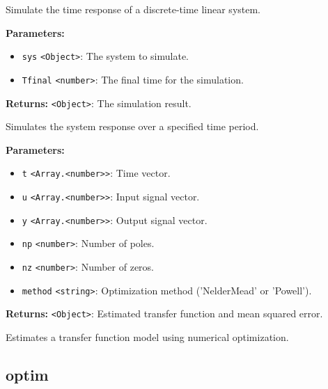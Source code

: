 \documentclass[12pt,a4paper]{article}
\begin{document}
\noindent Simulate the time response of a discrete-time linear system.

\vspace{5mm}
\noindent {}


\noindent \textbf{Parameters:}
\begin{itemize}
  \item \texttt{sys} \texttt{<Object>}: The system to simulate.
  \item \texttt{Tfinal} \texttt{<number>}: The final time for the simulation.
\end{itemize}

\noindent \textbf{Returns:} \texttt{<Object>}: The simulation result.

\noindent Simulates the system response over a specified time period.

\vspace{5mm}
\noindent {}


\noindent \textbf{Parameters:}
\begin{itemize}
  \item \texttt{t} \texttt{<Array.<number>>}: Time vector.
  \item \texttt{u} \texttt{<Array.<number>>}: Input signal vector.
  \item \texttt{y} \texttt{<Array.<number>>}: Output signal vector.
  \item \texttt{np} \texttt{<number>}: Number of poles.
  \item \texttt{nz} \texttt{<number>}: Number of zeros.
  \item \texttt{method} \texttt{<string>}: Optimization method ('NelderMead' or 'Powell').
\end{itemize}

\noindent \textbf{Returns:} \texttt{<Object>}: Estimated transfer function and mean squared error.

\noindent Estimates a transfer function model using numerical optimization.


\subsection{optim}
\vspace{5mm}
\noindent {}
\end{document}
